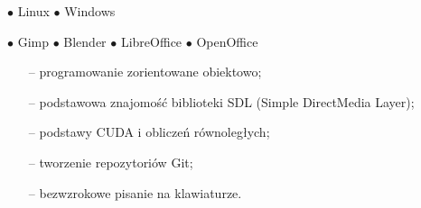 \documentclass[11pt,a4paper]{article}
\begin{document}
    \bigskip
    \noindent
    \begin{minipage}[t]{0.35\textwidth}
  
        
        
        \medskip
        \centerline{
            \hfill
            $\bullet$ Linux
            \hfill
            $\bullet$ Windows
            \hfill
        }
    \end{minipage}
    \begin{minipage}[t]{0.65\textwidth}
  
        
        
        \medskip
        \centerline{
            \hfill
            $\bullet$ Gimp
            \hfill
            $\bullet$ Blender
            \hfill
            $\bullet$ LibreOffice
            \hfill
            $\bullet$ OpenOffice
            \hfill
        }
    \end{minipage}
  
  
    \bigskip
    \vspace{-1mm}
    \begin{itemize} \itemsep2pt \parskip0pt 
        \item[--] programowanie zorientowane obiektowo;
        \item[--] podstawowa znajomość biblioteki SDL (Simple DirectMedia Layer);
        \item[--] podstawy CUDA i obliczeń równoległych;
        \item[--] tworzenie repozytoriów Git;
        \item[--] bezwzrokowe pisanie na klawiaturze.
    \end{itemize}
  
  
    \vspace{0.3cm}
  
\end{document}
